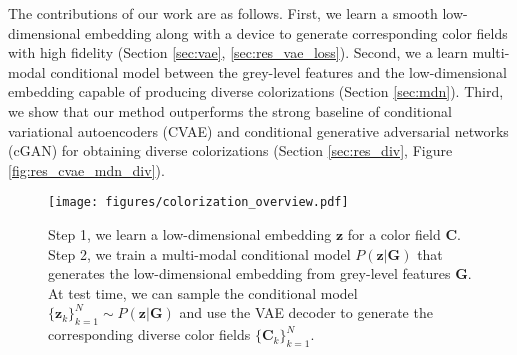 \documentclass[10pt,twocolumn,letterpaper]{article}
\begin{document}
The contributions of our work are as follows. First, we learn 
a smooth low-dimensional embedding along with a device to 
generate corresponding color fields with high fidelity 
(Section \ref{sec:vae}, \ref{sec:res_vae_loss}). Second, we a learn multi-modal conditional 
model between the grey-level features and the low-dimensional 
embedding capable of producing diverse colorizations (Section \ref{sec:mdn}). Third, we show that our
method outperforms the strong baseline of conditional 
variational autoencoders (CVAE) and conditional generative adversarial 
networks (cGAN) \cite{Isola} for obtaining diverse colorizations 
(Section \ref{sec:res_div}, Figure \ref{fig:res_cvae_mdn_div}).

\begin{figure*}[t]
\centering
\texttt{[image: figures/colorization\_overview.pdf]}
\caption{Step 1, we learn a low-dimensional embedding $\mathbf{z}$ for a color field 
$\mathbf{C}$. Step 2, we train a multi-modal conditional model $P(\mathbf{z}|\mathbf{G})$ 
that generates the low-dimensional embedding from grey-level features $\mathbf{G}$. At test time,
we can sample the conditional model $\{ \mathbf{z}_{k} \}_{k=1}^{N} \sim P(\mathbf{z}|\mathbf{G})$ 
and use the VAE decoder to generate the corresponding diverse color fields $\{ \mathbf{C}_k \}_{k=1}^{N}$.} 
\label{fig:overview} 
\end{figure*}
\end{document}
